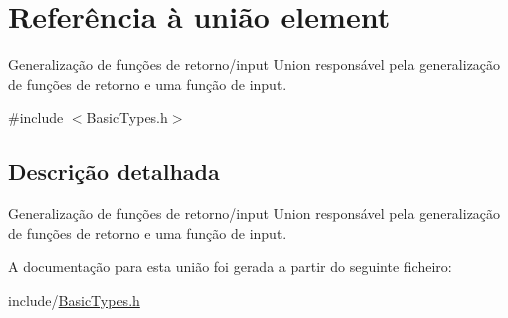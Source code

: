 \hypertarget{unionelement}{}\section{Referência à união element}
\label{unionelement}


Generalização de funções de retorno/input Union responsável pela generalização de funções de retorno e uma função de input.  




{\ttfamily \#include $<$Basic\+Types.\+h$>$}



\subsection{Descrição detalhada}
Generalização de funções de retorno/input Union responsável pela generalização de funções de retorno e uma função de input. 

A documentação para esta união foi gerada a partir do seguinte ficheiro\+:\begin{DoxyCompactItemize}
\item 
include/\hyperlink{BasicTypes_8h}{Basic\+Types.\+h}\end{DoxyCompactItemize}
